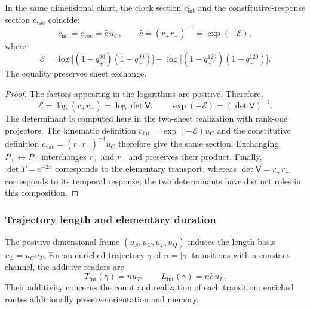 \begin{proposition}
\label{v:prop:identidad-velocidad}
In the same dimensional chart, the clock section $c_{\mathrm{int}}$
and the constitutive-response section $c_{\mathrm{vac}}$ coincide:
\begin{equation}
 c_{\mathrm{int}}=c_{\mathrm{vac}}
   =\widehat c\,u_C,
 \qquad
 \widehat c=(r_+r_-)^{-1}
            =\exp(-\mathcal E),
 \label{v:eq:identidad-velocidad}
\end{equation}
where
\begin{equation}
 \mathcal E=
 \log\!\bigl[(1-q_+^{90})(1-q_-^{90})\bigr]
 -\log\!\bigl[(1-q_+^{120})(1-q_-^{120})\bigr].
 \label{v:eq:velocidad-lector-simetrico}
\end{equation}
The equality preserves sheet exchange.
\end{proposition}
\begin{proof}
The factors appearing in the logarithms are positive. Therefore,
\[
 \mathcal E=\log(r_+r_-)
            =\log\det\mathsf V,
 \qquad \exp(-\mathcal E)=(\det\mathsf V)^{-1}.
\]
The determinant is computed here in the two-sheet realization with rank-one
projectors. The kinematic definition $c_{\mathrm{int}}=\exp(-\mathcal E)u_C$
and the constitutive definition $c_{\mathrm{vac}}=(r_+r_-)^{-1}u_C$
therefore give the same section. Exchanging $P_+\leftrightarrow
P_-$ interchanges $r_+$ and $r_-$ and preserves their product. Finally,
$\det T=e^{-2x}$ corresponds to the elementary transport, whereas
$\det\mathsf V=r_+r_-$ corresponds to its temporal response; the two
determinants have distinct roles in this composition.
\end{proof}

\subsubsection{Trajectory length and elementary duration}

The positive dimensional frame $(u_S,u_C,u_T,u_Q)$ induces the length
basis $u_L=u_Cu_T$. For an enriched trajectory $\gamma$ of
$n=|\gamma|$ transitions with a constant channel, the additive readers are
\begin{equation}
 T_{\mathrm{int}}(\gamma)=n u_T,
 \qquad L_{\mathrm{int}}(\gamma)=n\widehat c\,u_L.
 \label{v:eq:velocidad-longitud-reloj}
\end{equation}
Their additivity concerns the count and realization of each transition:
enriched routes additionally preserve orientation and memory.

